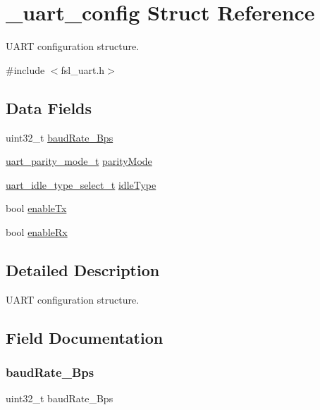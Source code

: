 \hypertarget{struct__uart__config}{}\section{\+\_\+uart\+\_\+config Struct Reference}
\label{struct__uart__config}


U\+A\+RT configuration structure.  




{\ttfamily \#include $<$fsl\+\_\+uart.\+h$>$}

\subsection*{Data Fields}
\begin{DoxyCompactItemize}
\item 
uint32\+\_\+t \mbox{\hyperlink{struct__uart__config_aa5df547b4cb95d3c959373cf6fa672b5}{baud\+Rate\+\_\+\+Bps}}
\item 
\mbox{\hyperlink{group__uart__driver_ga3d74bf70252b21a0dd19d61587ed320c}{uart\+\_\+parity\+\_\+mode\+\_\+t}} \mbox{\hyperlink{struct__uart__config_a316fd94f4c5e6d15a3cda133d5dd5683}{parity\+Mode}}
\item 
\mbox{\hyperlink{group__uart__driver_ga9457d04cb0bf9c547babd63a4d20a9fa}{uart\+\_\+idle\+\_\+type\+\_\+select\+\_\+t}} \mbox{\hyperlink{struct__uart__config_a00678135fe612c2ced015e2a85420b7d}{idle\+Type}}
\item 
bool \mbox{\hyperlink{struct__uart__config_a221caf5c134ec8fcee82b8505ee75731}{enable\+Tx}}
\item 
bool \mbox{\hyperlink{struct__uart__config_ac6fe4a8b966fb5611f77358b819671b2}{enable\+Rx}}
\end{DoxyCompactItemize}


\subsection{Detailed Description}
U\+A\+RT configuration structure. 

\subsection{Field Documentation}
\mbox{\label{struct__uart__config_aa5df547b4cb95d3c959373cf6fa672b5}} 
\subsubsection{\texorpdfstring{baudRate\_Bps}{baudRate\_Bps}}
{\footnotesize\ttfamily uint32\+\_\+t baud\+Rate\+\_\+\+Bps}

